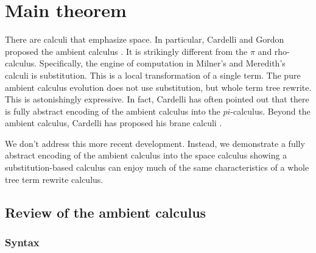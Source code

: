 \section{Main theorem}
There are calculi that emphasize space. In particular, Cardelli and
Gordon proposed the ambient calculus \cite{DBLP:journals/entcs/CardelliG97}. It is strikingly different from
the $\pi$ and rho-calculus. Specifically, the engine of computation in
Milner's and Meredith's calculi is substitution. This is a local
transformation of a single term. The pure ambient calculus evolution
does not use substitution, but whole term tree rewrite. This is
astonishingly expressive. In fact, Cardelli has often pointed out that
there is fully abstract encoding of the ambient calculus into the
$pi$-calculus. Beyond the ambient calculus, Cardelli has proposed his brane calculi \cite{DBLP:conf/cmsb/Cardelli04}.

We don't address this more recent development. Instead, we demonstrate
a fully abstract encoding of the ambient calculus into the space
calculus showing a substitution-based calculus can enjoy much of the same characteristics of a whole tree term rewrite calculus.

\subsection{Review of the ambient calculus}

\subsubsection{Syntax}

